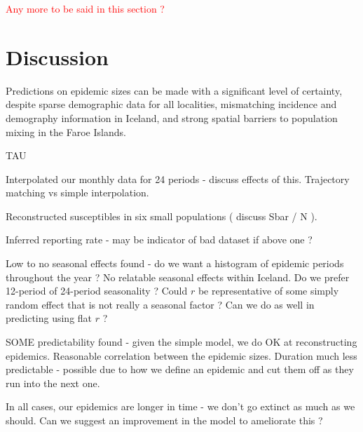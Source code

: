 \documentclass[10pt]{article}
\begin{document}
\textcolor{red}{Any more to be said in this section ?}




































\section*{Discussion}

Predictions on epidemic sizes can be made with a significant level of certainty, despite sparse demographic data for all localities, mismatching incidence and demography information in Iceland, and strong spatial barriers to population mixing in the Faroe Islands. 


TAU



Interpolated our monthly data for 24 periods - discuss effects of this. Trajectory matching vs simple interpolation.

Reconstructed susceptibles in six small populations ( discuss Sbar / N ).

Inferred reporting rate - may be indicator of bad dataset if above one ?

Low to no seasonal effects found - do we want a histogram of epidemic periods throughout the year ? No relatable seasonal effects within Iceland. Do we prefer 12-period of 24-period seasonality ? Could $r$ be representative of some simply random effect that is not really a seasonal factor ? Can we do as well in predicting using flat $r$ ?

SOME predictability found - given the simple model, we do OK at reconstructing epidemics. Reasonable correlation between the epidemic sizes. Duration much less predictable - possible due to how we define an epidemic and cut them off as they run into the next one.

In all cases, our epidemics are longer in time - we don't go extinct as much as we should. Can we suggest an improvement in the model to ameliorate this ?
\end{document}
